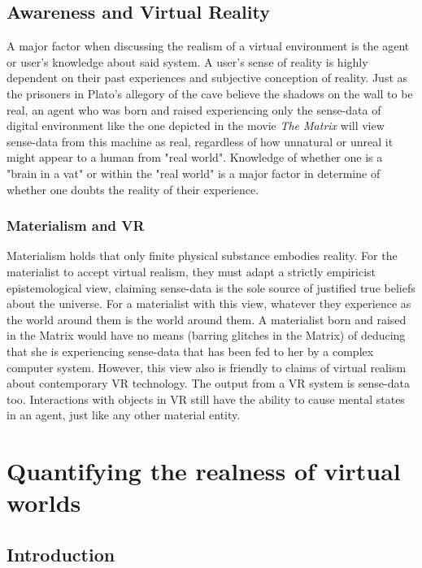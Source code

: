  

  \section{Awareness and Virtual Reality}
A major factor when discussing the realism of a virtual environment is the agent or user's knowledge about said system. A user's sense of reality is highly dependent on their past experiences and subjective conception of reality. Just as the prisoners in Plato's  allegory of the cave believe the shadows on the wall to be real, an agent who was born and raised experiencing only the sense-data of digital environment like the one depicted in the movie \textit{The Matrix} will view sense-data from this machine as real, regardless of how unnatural or unreal it might appear to a human from "real world". Knowledge of whether one is a "brain in a vat" or within the "real world" is a major factor in determine of whether one doubts the reality of their experience. 
 \subsection{Materialism and VR}
Materialism holds that only finite physical substance embodies reality. For the materialist to accept virtual realism, they must adapt a strictly empiricist epistemological view, claiming sense-data is the sole source of justified true beliefs about the universe. For a materialist with this view, whatever they experience as the world around them is the world around them. A materialist born and raised in the Matrix would have no means (barring glitches in the Matrix) of deducing that she is experiencing sense-data that has been fed to her by a complex computer system. However, this view also is friendly to claims of virtual realism about contemporary VR technology. The output from a VR system is sense-data too. Interactions with objects in VR still have the ability to cause mental states in an agent, just like any other material entity.

 
\chapter{Quantifying the realness of virtual worlds }\label{text}
\section{Introduction}


